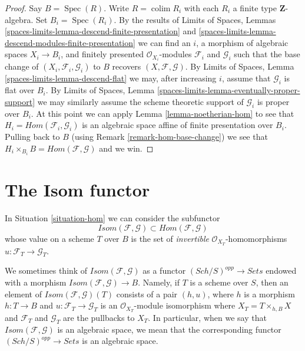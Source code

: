 \documentclass{stacks-project}
\theoremstyle{plain}
\theoremstyle{definition}
\theoremstyle{remark}
\numberwithin{equation}{subsection}
\def\colim{\mathop{\mathrm{colim}}\nolimits}
\def\Spec{\mathop{\mathrm{Spec}}}
\def\Sch{\mathit{Sch}}
\begin{document}
\begin{proof}
\medskip\noindent
Say $B = \Spec(R)$. Write $R = \colim R_i$ with each $R_i$ a finite
type $\mathbf{Z}$-algebra. Set $B_i = \Spec(R_i)$. By the results of
Limits of Spaces, Lemmas
\ref{spaces-limits-lemma-descend-finite-presentation} and
\ref{spaces-limits-lemma-descend-modules-finite-presentation}
we can find an $i$, a morphism of algebraic spaces $X_i \to B_i$,
and finitely presented $\mathcal{O}_{X_i}$-modules $\mathcal{F}_i$ and
$\mathcal{G}_i$ such that the base change of
$(X_i, \mathcal{F}_i, \mathcal{G}_i)$ to $B$ recovers
$(X, \mathcal{F}, \mathcal{G})$. By
Limits of Spaces, Lemma \ref{spaces-limits-lemma-descend-flat}
we may, after increasing $i$, assume that $\mathcal{G}_i$
is flat over $B_i$. By
Limits of Spaces, Lemma \ref{spaces-limits-lemma-eventually-proper-support}
we may similarly assume the scheme theoretic support of $\mathcal{G}_i$
is proper over $B_i$. At this point we can apply
Lemma \ref{lemma-noetherian-hom}
to see that $H_i = \mathit{Hom}(\mathcal{F}_i, \mathcal{G}_i)$ is
an algebraic space affine of finite presentation over $B_i$.
Pulling back to $B$ (using Remark \ref{remark-hom-base-change})
we see that $H_i \times_{B_i} B = \mathit{Hom}(\mathcal{F}, \mathcal{G})$ 
and we win.
\end{proof}






\section{The Isom functor}
\label{section-isom}

\noindent
In Situation \ref{situation-hom} we can consider the subfunctor
$$
\mathit{Isom}(\mathcal{F}, \mathcal{G}) \subset
\mathit{Hom}(\mathcal{F}, \mathcal{G})
$$
whose value on a scheme $T$ over $B$ is the set of {\it invertible}
$\mathcal{O}_{X_T}$-homomorphisms $u : \mathcal{F}_T \to \mathcal{G}_T$.

\medskip\noindent
We sometimes think of
$\mathit{Isom}(\mathcal{F}, \mathcal{G})$ as a functor
$(\Sch/S)^{opp} \to \textit{Sets}$
endowed with a morphism
$\mathit{Isom}(\mathcal{F}, \mathcal{G}) \to B$.
Namely, if $T$ is a scheme over $S$, then an element of
$\mathit{Isom}(\mathcal{F}, \mathcal{G})(T)$ consists of a pair
$(h, u)$, where $h$ is a morphism $h : T \to B$ and
$u : \mathcal{F}_T \to \mathcal{G}_T$ is an $\mathcal{O}_{X_T}$-module
isomorphism
where $X_T = T \times_{h, B} X$ and $\mathcal{F}_T$ and $\mathcal{G}_T$
are the pullbacks to $X_T$. In particular, when we say
that $\mathit{Isom}(\mathcal{F}, \mathcal{G})$ is an algebraic space,
we mean that the corresponding functor
$(\Sch/S)^{opp} \to \textit{Sets}$ is an algebraic space.
\end{document}
